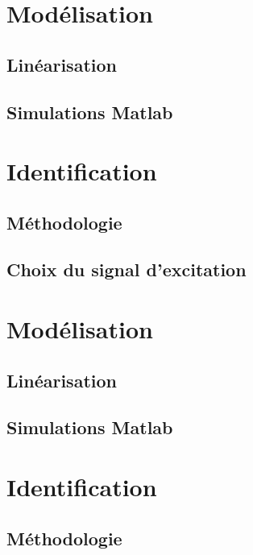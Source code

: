 \section{Modélisation}

\subsection{Linéarisation}
\subsection{Simulations Matlab}

\section{Identification}

\subsection{Méthodologie}

\subsection{Choix du signal d'excitation}

\section{Modélisation}

\subsection{Linéarisation}

\subsection{Simulations Matlab}

\section{Identification}

\subsection{Méthodologie}

